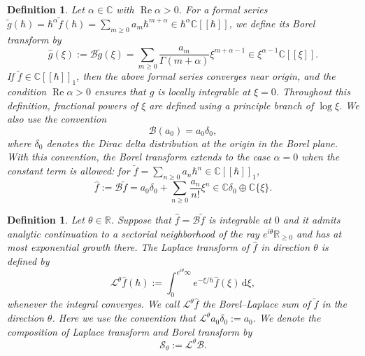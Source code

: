 \documentclass[11pt]{amsart}
\theoremstyle{plain}
\newtheorem{defn}[thm]{Definition}
\theoremstyle{definition}
\newcommand{\R}{\mathbb{R}}
\newcommand{\C}{\mathbb{C}}
\newcommand{\dd}{\mathrm d}
\begin{document}
\begin{defn}
Let $\alpha\in\C$ with $\operatorname{Re}\alpha>0$. For a formal series $\widetilde g(\hbar)
=
\hbar^\alpha \widetilde f(\hbar)
=
\sum\limits_{m\ge0}a_m\hbar^{m+\alpha}
\in \hbar^\alpha\C[[\hbar]]$,
we define its Borel transform by
\begin{equation*}
\widehat g(\xi)
:=
\mathcal B\widetilde g(\xi)
=
\sum_{m\ge0}
\frac{a_m}{\Gamma(m+\alpha)}
\xi^{m+\alpha-1}
\in
\xi^{\alpha-1}\C[[\xi]].
\end{equation*}
If $\widetilde f \in\C[[\hbar]]_1$, then the above formal
series converges near origin, and the condition
$\operatorname{Re}\alpha>0$ ensures that $\widehat g$ is locally integrable
at $\xi=0$. Throughout
this definition, fractional powers of $\xi$ are defined using a principle branch
of $\log\xi$. We also use the convention
\begin{equation*}
\mathcal B(a_0)=a_0\delta_0,
\end{equation*}
where $\delta_0$ denotes the Dirac delta distribution at the origin in the
Borel plane. With this convention, the Borel transform extends to the case
$\alpha=0$ when the constant term is allowed: for $\widetilde f =\sum\limits_{n\geq 0} a_n \hbar^n\in\C[[\hbar]]_1$,
\[\widehat f:=\mathcal{B} \widetilde f = a_0\delta_0+\sum\limits_{n\geq0}\frac{a_n}{n!}\xi^n \in \C\delta_0 \oplus \C\{\xi\}.\]
\end{defn}

\begin{defn}\label{defn:Laplace}
Let $\theta\in\R$. Suppose that $\widehat f=\mathcal B\widetilde f$ is integrable at $0$ and it  admits
analytic continuation to a sectorial neighborhood of the ray
$e^{i\theta}\R_{\ge0}$ and has at most exponential growth there. The
Laplace transform of $\widehat f$ in direction $\theta$ is defined by
\begin{equation*}
\mathcal L^\theta\widehat f(\hbar)
:=
\int_{0}^{e^{i\theta}\infty}
e^{-\xi/\hbar}\widehat f(\xi)\,\dd\xi,
\end{equation*}
whenever the integral converges. We call
$\mathcal L^\theta\widehat f$ the Borel--Laplace sum of
$\widetilde f$ in the direction $\theta$. Here we use the convention that $\mathcal{L}^{\theta} a_0 \delta_0 := a_0$.
We denote the composition of Laplace transform and Borel transform by
\begin{equation*}
\mathcal S_\theta := \mathcal{L}^\theta \mathcal{B}.
\end{equation*}
\end{defn}
\end{document}
